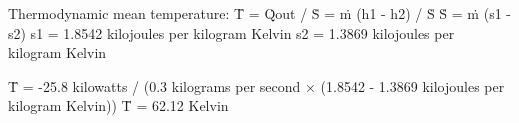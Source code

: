 Thermodynamic mean temperature:  
T̄ = Q̇out / Ṡ = ṁ (h1 - h2) / Ṡ  
Ṡ = ṁ (s1 - s2)  
s1 = 1.8542 kilojoules per kilogram Kelvin  
s2 = 1.3869 kilojoules per kilogram Kelvin  

T̄ = -25.8 kilowatts / (0.3 kilograms per second × (1.8542 - 1.3869 kilojoules per kilogram Kelvin))  
T̄ = 62.12 Kelvin